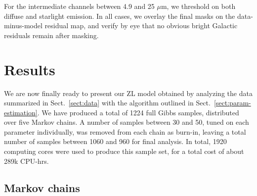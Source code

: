 \documentclass[twocolumn]{aa}
\begin{document}
For the intermediate channels between 4.9 and 25\,$\,\mu$m, we
threshold on both diffuse and starlight emission. In all cases, we
overlay the final masks on the data-minus-model residual map, and
verify by eye that no obvious bright Galactic residuals remain after
masking. 

\section{Results}\label{sect:improved-model}

We are now finally ready to present our ZL model obtained
by analyzing the data summarized in Sect.~\ref{sect:data} with the
algorithm outlined in Sect.~\ref{sect:param-estimation}. We have
produced a total of 1224 full Gibbs samples, distributed over five
Markov chains. A number of samples between 30 and 50, tuned on each parameter 
individually, was removed from each chain as burn-in, 
leaving a total number of samples between 1060 and 960 for final analysis. In total,
1920 computing cores were used to produce this sample set, for a
total cost of about 289k CPU-hrs.

\subsection{Markov chains}


\end{document}
